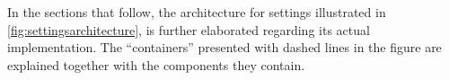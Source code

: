 In the sections that follow, the architecture for settings illustrated in \cref{fig:settingsarchitecture}, is further elaborated regarding its actual implementation.
The ``containers'' presented with dashed lines in the figure are explained together with the components they contain.